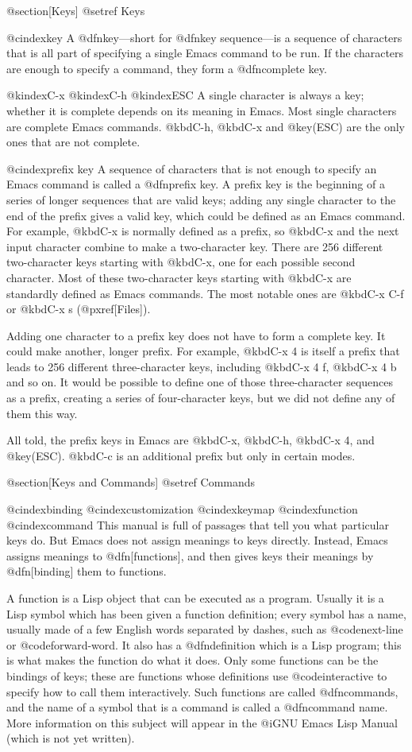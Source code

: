 {{@section[Keys]
@setref Keys

@cindex{key}
  A @dfn{key}---short for @dfn{key sequence}---is a sequence of characters
that is all part of specifying a single Emacs command to be run.  If the
characters are enough to specify a command, they form a @dfn{complete key}.

@kindex{C-x}
@kindex{C-h}
@kindex{ESC}
  A single character is always a key; whether it is complete depends on its
meaning in Emacs.  Most single characters are complete Emacs commands.
@kbd{C-h}, @kbd{C-x} and @key(ESC) are the only ones that are not
complete.

@cindex{prefix key}
  A sequence of characters that is not enough to specify an Emacs command
is called a @dfn{prefix key}.  A prefix key is the beginning of a series of
longer sequences that are valid keys; adding any single character to the
end of the prefix gives a valid key, which could be defined as an Emacs
command.  For example, @kbd{C-x} is normally defined as a prefix, so
@kbd{C-x} and the next input character combine to make a two-character key.
There are 256 different two-character keys starting with @kbd{C-x}, one for
each possible second character.  Most of these two-character keys starting
with @kbd{C-x} are standardly defined as Emacs commands.  The most notable
ones are @kbd{C-x C-f} or @kbd{C-x s} (@pxref[Files]).

  Adding one character to a prefix key does not have to form a complete
key.  It could make another, longer prefix.  For example, @kbd{C-x 4} is
itself a prefix that leads to 256 different three-character keys, including
@kbd{C-x 4 f}, @kbd{C-x 4 b} and so on.  It would be possible to define one
of those three-character sequences as a prefix, creating a series of
four-character keys, but we did not define any of them this way.

  All told, the prefix keys in Emacs are @kbd{C-x}, @kbd{C-h}, @kbd{C-x 4},
and @key(ESC).  @kbd{C-c} is an additional prefix but only in certain
modes.

@section[Keys and Commands]
@setref Commands

@cindex{binding}
@cindex{customization}
@cindex{keymap}
@cindex{function}
@cindex{command}
  This manual is full of passages that tell you what particular keys do.
But Emacs does not assign meanings to keys directly.  Instead, Emacs
assigns meanings to @dfn[functions], and then gives keys their meanings by
@dfn[binding] them to functions. 

  A function is a Lisp object that can be executed as a program.
Usually it is a Lisp symbol which has been given a function definition;
every symbol has a name, usually made of a few English words separated by
dashes, such as @code{next-line} or @code{forward-word}.  It also has a
@dfn{definition} which is a Lisp program; this is what makes the function
do what it does.  Only some functions can be the bindings of keys; these
are functions whose definitions use @code{interactive} to specify how to
call them interactively.  Such functions are called @dfn{commands}, and
the name of a symbol that is a command is called a @dfn{command name}.
More information on this subject will appear in the @i{GNU Emacs Lisp
Manual} (which is not yet written).

}}
